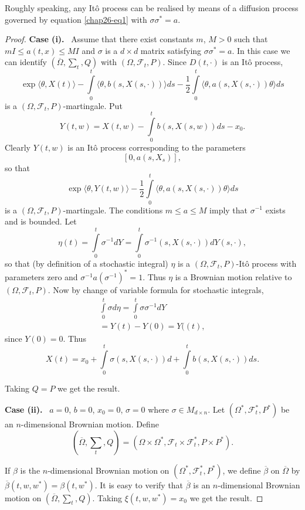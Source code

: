 Roughly speaking, any It\^o process can be realised by means of a
diffusion process governed by equation \eqref{chap26-eq1} with
$\sigma\sigma^{*}=a$. 

\begin{proof}
{\bf Case (i).}~ Assume that there exist constants $m$, $M>0$ such
that $mI\leq a(t,x)\leq MI$ and $\sigma$ is a $d\times d$ matrix
satisfying $\sigma\sigma^{*}=a$. In this case we can identify
$(\overline{\Omega},\sum_{t},Q)$ with
$(\Omega,\mathscr{F}_{t},P)$. Since $D(t,\cdot)$ is an It\^o process,
$$
\exp\langle \theta,X(t)\rangle -\int\limits^{t}_{0}\langle
\theta,b(s,X(s,\cdot))\rangle ds-\frac{1}{2}\int\limits^{t}_{0}\langle
\theta,a(s,X(s,\cdot))\theta\rangle ds 
$$ 
is a $(\Omega,\mathscr{F}_{t},P)$-martingale. Put
$$
Y(t,w)=X(t,w)-\int\limits^{t}_{0}b(s,X(s,w))ds-x_{0}.
$$
Clearly $Y(t,w)$ is an It\^o process corresponding to the parameters
$$
[0,a(s,X_{s})],
$$ 
so that
$$
\exp\langle \theta, Y(t,w)\rangle
-\frac{1}{2}\int\limits^{t}_{0}\langle
\theta,a(s,X(s,\cdot))\theta\rangle ds
$$
is a $(\Omega,\mathscr{F}_{t},P)$-martingale. The conditions $m\leq
a\leq M$ imply that $\sigma^{-1}$ exists and is bounded. Let
$$
\eta(t)=\int\limits^{t}_{0}\sigma^{-1}dY=\int\limits^{t}_{0}\sigma^{-1}(s,X(s,\cdot))dY(s,\cdot),
$$\pageoriginale
so that (by definition of a stochastic integral) $\eta$ is a
$(\Omega,\mathscr{F}_{t},P)$-It\^o process with parameters zero and
$\sigma^{-1} a (\sigma^{-1})^{*}=1$. Thus $\eta$ is a Brownian
motion relative to $(\Omega,\mathscr{F}_{t},P)$. Now by change of
variable formula for stochastic integrals,
\begin{gather*}
\int\limits^{t}_{0}\sigma
d\eta=\int\limits^{t}_{0}\sigma\sigma^{-1}dY\\
=Y(t)-Y(0)=Y((t),
\end{gather*}
since $Y(0)=0$. Thus
$$
X(t)=x_{0}+\int\limits^{t}_{0}\sigma(s,X(s,\cdot))d+\int\limits^{t}_{0}b(s,X(s,\cdot))ds. 
$$

Taking $Q=P$ we get the result.

\medskip
\noindent
{\bf Case (ii).}~ $a=0$, $b=0$, $x_{0}=0$, $\sigma=0$ where $\sigma\in
M_{d\times n}$. Let $(\Omega^{*},\mathscr{F}^{*}_{t},P^{*})$ be an
$n$-dimensional Brownian motion. Define
$$
(\overline{\Omega},\sum_{t},Q)=(\Omega\times
\Omega^{*},\mathscr{F}_{t}\times \mathscr{F}^{*}_{t},P\times P^{*}).
$$

If $\beta$ is the $n$-dimensional Brownian motion on
$(\Omega^{*},\mathscr{F}^{*}_{t},P^{*})$, we define $\overline{\beta}$
on $\overline{\Omega}$ by
$\overline{\beta}(t,w,w^{*})=\beta(t,w^{*})$. It is easy to verify
that $\overline{\beta}$ is an $n$-dimensional Brownian motion on
$(\overline{\Omega},\sum_{t},Q)$. Taking $\xi(t,w,w^{*})=x_{0}$ we get
the result.
\end{proof}

